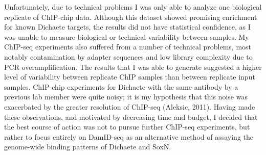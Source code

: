 Unfortunately, due to technical problems I was only able to analyze one biological replicate of ChIP-chip data. Although this dataset showed promising enrichment for known Dichaete targets, the results did not have statistical confidence, as I was unable to measure biological or technical variability between samples. My ChIP-seq experiments also suffered from a number of technical problems, most notably contamination by adapter sequences and low library complexity due to PCR overamplification. The results that I was able to generate suggested a higher level of variability between replicate ChIP samples than between replicate input samples. ChIP-chip experiments for Dichaete with the same antibody by a previous lab member were quite noisy; it is my hypothesis that this noise was exacerbated by the greater resolution of ChIP-seq (Aleksic, 2011). Having made these observations, and motivated by decreasing time and budget, I decided that the best course of action was not to pursue further ChIP-seq experiments, but rather to focus entirely on DamID-seq as an alternative method of assaying the genome-wide binding patterns of Dichaete and SoxN.


